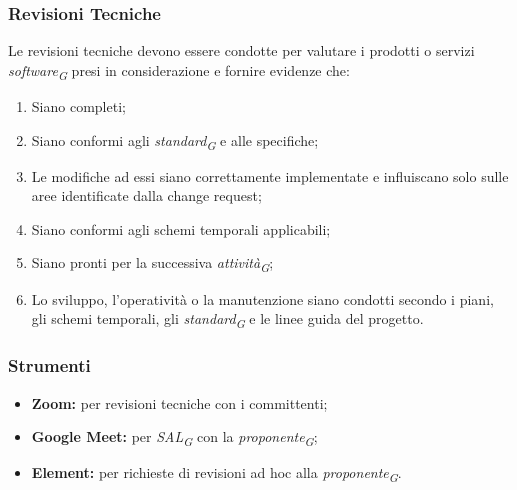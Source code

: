 \subsubsection{Revisioni Tecniche}
Le revisioni tecniche devono essere condotte per valutare i prodotti o servizi \textit{software}\textsubscript{\textit{G}} presi in considerazione e fornire evidenze che:

\begin{enumerate}
    \item Siano completi;
    \item Siano conformi agli \textit{standard}\textsubscript{\textit{G}} e alle specifiche;
    \item Le modifiche ad essi siano correttamente implementate e influiscano solo sulle aree identificate dalla change request;
    \item Siano conformi agli schemi temporali applicabili;
    \item Siano pronti per la successiva \textit{attività}\textsubscript{\textit{G}};
    \item Lo sviluppo, l'operatività o la manutenzione siano condotti secondo i piani, gli schemi temporali, gli \textit{standard}\textsubscript{\textit{G}} e le linee guida del progetto.
\end{enumerate}

\subsubsection{Strumenti}

\begin{itemize}
    \item \textbf{Zoom:} per revisioni tecniche con i committenti;
    \item \textbf{Google Meet:} per \textit{SAL}\textsubscript{\textit{G}} con la \textit{proponente}\textsubscript{\textit{G}}; 
    \item \textbf{Element:} per richieste di revisioni ad hoc alla \textit{proponente}\textsubscript{\textit{G}}.
\end{itemize}
